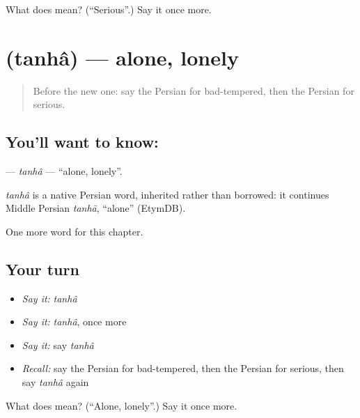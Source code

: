 \begin{tcolorbox}[breakable,colback=teal!4,colframe=teal!35!black,title={Before you move on}]
What does  mean? (\textquotedblleft{}Serious\textquotedblright{}.) Say it once more.
\end{tcolorbox}
\section[\texorpdfstring{\fa{تنها} (tanhâ)}{تنها (tanhâ)}]{ (tanhâ) — alone, lonely}

\label{lesson:FA-C200-tanha}



\begin{quote}
Before the new one: say the Persian for bad-tempered, then the Persian for serious.
\end{quote}

\subsection*{You'll want to know: }
\textbf{} — \emph{tanhâ} — \textquotedblleft{}alone, lonely\textquotedblright{}.

\begin{cousinweb}
\emph{tanhâ} is a native Persian word, inherited rather than borrowed: it continues Middle Persian \emph{tanhā}, \textquotedblleft{}alone\textquotedblright{} (EtymDB).
\end{cousinweb}

\begin{grammarlens}[title={What you've built}]
One more word for this chapter.
\end{grammarlens}

\subsection*{Your turn}
\begin{itemize}
\raggedright
  \item \emph{Say it:} \emph{tanhâ}
  \item \emph{Say it:} \emph{tanhâ}, once more
  \item \emph{Say it:} say \emph{tanhâ}
  \item \emph{Recall:} say the Persian for bad-tempered, then the Persian for serious, then say \emph{tanhâ} again
\end{itemize}

\begin{tcolorbox}[breakable,colback=teal!4,colframe=teal!35!black,title={Before you move on}]
What does  mean? (\textquotedblleft{}Alone, lonely\textquotedblright{}.) Say it once more.
\end{tcolorbox}
